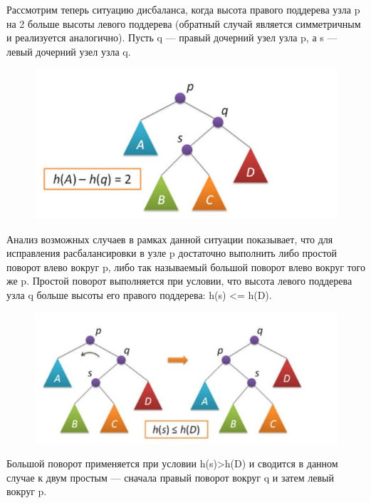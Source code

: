 Рассмотрим теперь ситуацию дисбаланса, когда высота правого поддерева узла p на 2 больше высоты левого поддерева (обратный случай является симметричным и реализуется аналогично).
Пусть q — правый дочерний узел узла p, а s — левый дочерний узел узла q.

\begin{figure}[!ht]
\begin{center}
\includegraphics[scale=0.5]{./images/1.jpg}\caption{}\label{figure1}
\end{center}
\end{figure}

Анализ возможных случаев в рамках данной ситуации показывает, что для исправления расбалансировки в узле p достаточно выполнить либо простой поворот влево вокруг p, либо так называемый большой поворот влево вокруг того же p. Простой поворот выполняется при условии,
что высота левого поддерева узла q больше высоты его правого поддерева: h(s) <= h(D).

\begin{figure}[!ht]
\begin{center}
\includegraphics[scale=0.5]{./images/2.jpg}\caption{}\label{figure1}
\end{center}
\end{figure}

Большой поворот применяется при условии h(s)>h(D) и сводится в данном случае к двум простым — сначала правый поворот вокруг q и затем левый вокруг p.

